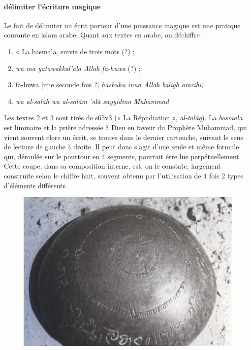 \paragraph{délimiter l'écriture magique} Le fait de délimiter un écrit porteur d'une puissance magique est une pratique courante en islam arabe. Quant aux textes en arabe, on déchiffre : 
\begin{enumerate}
 
    \item   « La basmala, suivie de trois mots (?) ;   \item  \textit{wa ma
yatawakkal'ala Allah fa-huwa} (?) ;   \item  fa-huwa [une seconde fois ?] \textit{hasbuhu inna Alläh baligh amrihi;}
\item \textit{ wa al-salâh wa al-salâm 'alâ sayyidina Muhammad}
\end{enumerate}
Les textes 2 et 3 sont tirés de s65v3 (« La Répudiation », \textit{al-talâq}). La \textit{basmala} est liminaire et la prière adressée à Dieu en faveur du Prophète Muhammad, qui vient souvent clore un écrit, se trouve dans le dernier cartouche, suivant le sens de lecture de gauche à droite. Il peut donc s'agir d'une seule et même formule qui, déroulée sur le pourtour en 4 segments, pourrait être lue perpétuellement. Cette coupe, dans sa composition interne, est, on le constate, largement construite selon le chiffre huit, souvent obtenu par l'utilisation de 4 fois 2 types d'éléments différents.
 \begin{figure}
     \centering
 
     \includegraphics[width=\textwidth]{HommeetIslam/Images/IMG_2456recadre.png}
     \label{fig:my_label}
 \end{figure}

